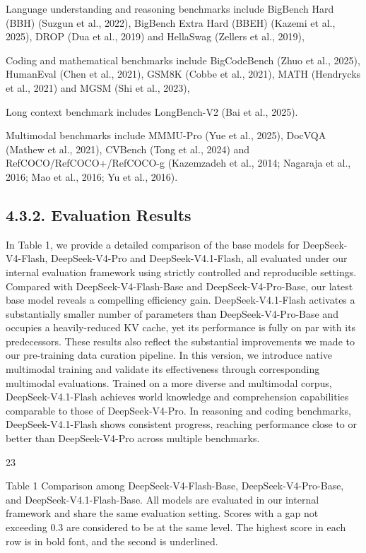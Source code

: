 \documentclass[
  10
]{article}
\begin{document}
Language understanding and reasoning benchmarks include BigBench Hard
(BBH) (Suzgun et al., 2022), BigBench Extra Hard (BBEH) (Kazemi et al.,
2025), DROP (Dua et al., 2019) and HellaSwag (Zellers et al., 2019),

Coding and mathematical benchmarks include BigCodeBench (Zhuo et al.,
2025), HumanEval (Chen et al., 2021), GSM8K (Cobbe et al., 2021), MATH
(Hendrycks et al., 2021) and MGSM (Shi et al., 2023),

Long context benchmark includes LongBench-V2 (Bai et al., 2025).

Multimodal benchmarks include MMMU-Pro (Yue et al., 2025), DocVQA
(Mathew et al., 2021), CVBench (Tong et al., 2024) and
RefCOCO/RefCOCO+/RefCOCO-g (Kazemzadeh et al., 2014; Nagaraja et al.,
2016; Mao et al., 2016; Yu et al., 2016).

\subsection{4.3.2. Evaluation Results}\label{evaluation-results}

In Table 1, we provide a detailed comparison of the base models for
DeepSeek-V4-Flash, DeepSeek-V4-Pro and DeepSeek-V4.1-Flash, all
evaluated under our internal evaluation framework using strictly
controlled and reproducible settings. Compared with
DeepSeek-V4-Flash-Base and DeepSeek-V4-Pro-Base, our latest base model
reveals a compelling efficiency gain. DeepSeek-V4.1-Flash activates a
substantially smaller number of parameters than DeepSeek-V4-Pro-Base and
occupies a heavily-reduced KV cache, yet its performance is fully on par
with its predecessors. These results also reflect the substantial
improvements we made to our pre-training data curation pipeline. In this
version, we introduce native multimodal training and validate its
effectiveness through corresponding multimodal evaluations. Trained on a
more diverse and multimodal corpus, DeepSeek-V4.1-Flash achieves world
knowledge and comprehension capabilities comparable to those of
DeepSeek-V4-Pro. In reasoning and coding benchmarks, DeepSeek-V4.1-Flash
shows consistent progress, reaching performance close to or better than
DeepSeek-V4-Pro across multiple benchmarks.

23

Table 1 \textbar{} Comparison among DeepSeek-V4-Flash-Base,
DeepSeek-V4-Pro-Base, and DeepSeek-V4.1-Flash-Base. All models are
evaluated in our internal framework and share the same evaluation
setting. Scores with a gap not exceeding 0.3 are considered to be at the
same level. The highest score in each row is in bold font, and the
second is underlined.
\end{document}
